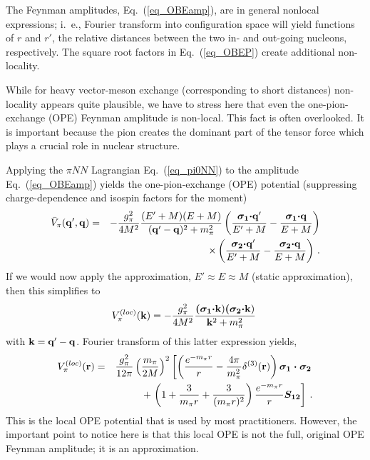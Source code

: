 The Feynman amplitudes, Eq.~(\ref{eq_OBEamp}), are in general nonlocal
expressions; i.~e., Fourier transform into 
configuration space
will yield functions of $r$ and $r'$, the relative
distances between the two in- and out-going nucleons,
respectively.
The square root factors in Eq.~(\ref{eq_OBEP}) create additional non-locality.

While for heavy vector-meson exchange (corresponding to short distances)
non-locality appears quite plausible, we have to stress here
that even the one-pion-exchange (OPE) Feynman 
amplitude is non-local.
This fact is often overlooked.
It is important because the pion creates the dominant part of the tensor force
which plays a crucial role in nuclear structure.


Applying 
the $\pi NN$ Lagrangian Eq.~(\ref{eq_pi0NN})
to the amplitude Eq.~(\ref{eq_OBEamp})
yields the one-pion-exchange (OPE) potential 
(suppressing charge-dependence and isospin factors for the moment)
\begin{eqnarray}
\bar{V}_\pi ({\bf q'}, {\bf q}) & =&  -\frac{g^2_\pi}{4M^2}
\frac{(E'+M)(E+M)}
{({\bf q'}-{\bf q})^2+m_\pi^2}
\left(
 \frac{\mbox{\boldmath $\sigma_{1} \cdot $} {\bf q'}}{E'+M}
-
 \frac{\mbox{\boldmath $\sigma_{1} \cdot $} {\bf q}}{E+M}
\right)
\nonumber \\
 & & \times
\left(
 \frac{\mbox{\boldmath $\sigma_{2} \cdot $} {\bf q'}}{E'+M}
-
 \frac{\mbox{\boldmath $\sigma_{2} \cdot $} {\bf q}}{E+M}
\right) 
\, .
\label{eq_OPEPrel}
\end{eqnarray}
If we would now apply the approximation,
$E'\approx E \approx M$ (static approximation), 
then this simplifies to
\begin{equation}
V_\pi^{(loc)}({\bf k})  =  -\frac{g_{\pi}^{2}}{4M^{2}}
 \frac{{\mbox {\boldmath $(\sigma_{1} \cdot $}} {\bf k)}
{\mbox{\boldmath $(\sigma_{2} \cdot $}} {\bf k)}}
 {{\bf k}^{2}+m_{\pi}^{2}}
\;
\label{eq_OPEPnr}
\end{equation}
with ${\bf k} = {\bf q'} - {\bf q}$.
Fourier transform of this latter expression yields,
\begin{eqnarray}
V_\pi^{(loc)}({\bf r}) & = &
\frac{g^2_\pi}{12\pi} 
\left(\frac{m_\pi}{2M}\right)^2
\left[ 
\left(
\frac{e^{-m_\pi r}}{r}
-\frac{4\pi}{m_\pi^2}\delta^{(3)}({\bf r})
\right)
\mbox{\boldmath $\sigma_{1} \cdot \sigma_{2}$}
\right.
\nonumber \\
& & +
\left.
\left(1+\frac{3}{m_\pi r}+\frac{3}{(m_\pi r)^2}\right)
\frac{e^{-m_\pi r}}{r}
\mbox{\boldmath $S_{12}$} 
\right] 
\: .
\label{eq_OPEPnrr}
\end{eqnarray}
This is the local OPE potential that is used by most practitioners.
However, the important point to notice here is that this local
OPE is not the full, original OPE Feynman amplitude; 
it is an approximation.

